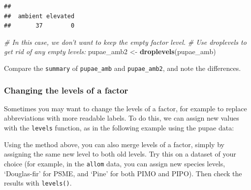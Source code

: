 \documentclass[]{book}
\newenvironment{Shaded}{\begin{snugshade}}{\end{snugshade}}
\newcommand{\CommentTok}[1]{\textcolor[rgb]{0.56,0.35,0.01}{\textit{#1}}}
\newcommand{\DecValTok}[1]{\textcolor[rgb]{0.00,0.00,0.81}{#1}}
\newcommand{\KeywordTok}[1]{\textcolor[rgb]{0.13,0.29,0.53}{\textbf{#1}}}
\newcommand{\NormalTok}[1]{#1}
\newcommand{\OperatorTok}[1]{\textcolor[rgb]{0.81,0.36,0.00}{\textbf{#1}}}
\newcommand{\StringTok}[1]{\textcolor[rgb]{0.31,0.60,0.02}{#1}}
\let\BeginKnitrBlock\begin \let\EndKnitrBlock\end
\begin{document}
\begin{verbatim}
## 
##  ambient elevated 
##       37        0
\end{verbatim}

\begin{Shaded}
\begin{Highlighting}[]
\CommentTok{# In this case, we don't want to keep the empty factor level.}
\CommentTok{# Use droplevels to get rid of any empty levels:}
\NormalTok{pupae_amb2 <-}\StringTok{ }\KeywordTok{droplevels}\NormalTok{(pupae_amb)}
\end{Highlighting}
\end{Shaded}

\BeginKnitrBlock{rmdtry}
Compare the \texttt{summary} of \texttt{pupae\_amb} and \texttt{pupae\_amb2}, and note the differences.
\EndKnitrBlock{rmdtry}

\hypertarget{changelevels}{%
\subsubsection{Changing the levels of a factor}\label{changelevels}}

Sometimes you may want to change the levels of a factor, for example to replace abbreviations with more readable labels. To do this, we can assign new values with the \texttt{levels} function, as in the following example using the pupae data:

\begin{Shaded}
\end{Shaded}

\BeginKnitrBlock{rmdtry}
Using the method above, you can also merge levels of a factor, simply by assigning the same new level to both old levels. Try this on a dataset of your choice (for example, in the \texttt{allom} data, you can assign new species levels, `Douglas-fir' for PSME, and `Pine' for both PIMO and PIPO). Then check the results with \texttt{levels()}.
\EndKnitrBlock{rmdtry}
\end{document}
